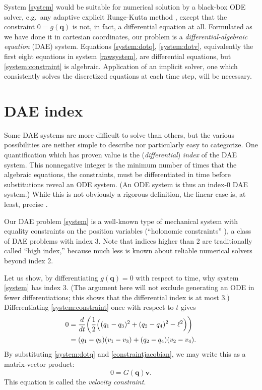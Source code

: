 \documentclass[letterpaper,final,12pt,reqno]{amsart}
\newcommand{\bq}{\mathbf{q}}
\newcommand{\bv}{\mathbf{v}}
\begin{document}
System \eqref{system} would be suitable for numerical solution by a black-box ODE solver, e.g.~any adaptive explicit Runge-Kutta method \cite{AscherPetzold1998}, except that the constraint $0=g(\bq)$ is not, in fact, a differential equation at all.  Formulated as we have done it in cartesian coordinates, our problem is a \emph{differential-algebraic equation} (DAE) system.  Equations \eqref{system:dotq}, \eqref{system:dotv}, equivalently the first eight equations in system \eqref{rawsystem}, are differential equations, but \eqref{system:constraint} is algebraic.  Application of an implicit solver, one which consistently solves the discretized equations at each time step, will be necessary.


\section{DAE index}

Some DAE systems are more difficult to solve than others, but the various possibilities are neither simple to describe nor particularly easy to categorize.  One quantification which has proven value is the (\emph{differential}) \emph{index} of the DAE system.  This nonnegative integer is the minimum number of times that the algebraic equations, the constraints, must be differentiated in time before substitutions reveal an ODE system.  (An ODE system is thus an index-0 DAE system.)  While this is not obviously a rigorous definition, the linear case is, at least, precise \cite[Chapter IV.5]{HairerWanner1996}.

Our DAE problem \eqref{system} is a well-known type of mechanical system with equality constraints on the position variables (``holonomic constraints'' \cite{Lanczos1970}), a class of DAE problems with index 3.  Note that indices higher than 2 are traditionally called ``high index,'' because much less is known about reliable numerical solvers beyond index 2.

Let us show, by differentiating $g(\bq)=0$ with respect to time, why system \eqref{system} has index 3.  (The argument here will not exclude generating an ODE in fewer differentiations; this shows that the differential index is at most 3.)  Differentiating \eqref{system:constraint} once with respect to $t$ gives
\begin{align}
0 &= \frac{d}{dt} \bigg(\frac{1}{2} \Big((q_1 - q_3)^2 + (q_2 - q_4)^2 - \ell^2\Big)\bigg) \notag \\
  &= (q_1 - q_3)(v_1 - v_3) + (q_2 - q_4) (v_2 - v_4). \label{rawvelocityconstraint}
\end{align}
By substituting \eqref{system:dotq} and \eqref{constraintjacobian}, we may write this as a matrix-vector product:
\begin{equation}
0 = G(\bq) \bv. \label{velocityconstraint}
\end{equation}
This equation is called the \emph{velocity constraint}.
\end{document}
